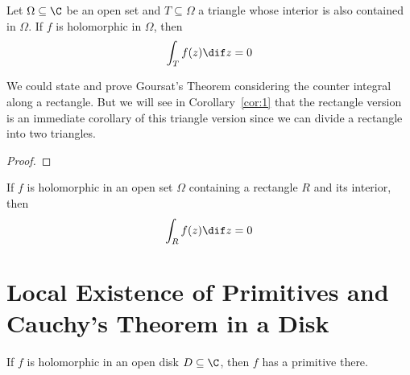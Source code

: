 \documentclass[thmcnt=section, color=cyan, 12pt]{my-elegantbook}
\begin{document}
\begin{theorem} \label{thm:4}
    Let $\Omega \subseteq \C$ be an open set and $T \subseteq \Omega$ a triangle whose interior is also contained in $\Omega$.
    If $f$ is holomorphic in $\Omega$, then
    \begin{align*}
        \int_{T} f(z) \dif z = 0
    \end{align*}
\end{theorem}

We could state and prove Goursat's Theorem
considering the counter integral along a rectangle.
But we will see in Corollary~\ref{cor:1}
that the rectangle version is an immediate corollary of this triangle version
since we can divide a rectangle into two triangles.

\begin{proof}
\end{proof}

\begin{corollary} \label{cor:1}
    If $f$ is holomorphic in an open set $\Omega$
    containing a rectangle $R$ and its interior, then
    \begin{align*}
        \int_{R} f(z) \dif z = 0
    \end{align*}
\end{corollary}


\section{Local Existence of Primitives and Cauchy's Theorem in a Disk}

\begin{theorem}
    If $f$ is holomorphic in an open disk $D \subseteq \C$, then $f$ has a primitive there.
\end{theorem}
\end{document}
